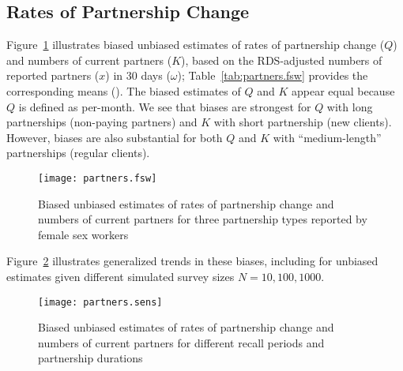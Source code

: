 \subsection{Rates of Partnership Change}\label{res.partners}
Figure~\ref{fig:partners.fsw} illustrates biased \vs unbiased estimates of
rates of partnership change ($Q$) and numbers of current partners ($K$),
based on the RDS-adjusted numbers of reported partners ($x$) in 30 days ($\omega$);
Table~\ref{tab:partners.fsw} provides the corresponding means (\ci).
The biased estimates of $Q$ and $K$ appear equal because $Q$ is defined as per-month.
We see that biases are strongest for
$Q$ with long partnerships (\eg non-paying partners) and
$K$ with short partnership (\eg new clients).
However, biases are also substantial for
both $Q$ and $K$ with ``medium-length'' partnerships (\eg regular clients).
\begin{figure}
  \centering\texttt{[image: partners.fsw]}
  \caption{Biased \vs unbiased estimates of
    rates of partnership change and numbers of current partners
    for three partnership types reported by female sex workers}
  \label{fig:partners.fsw}
\end{figure}
\par
Figure~\ref{fig:partners.sens} illustrates generalized trends in these biases,
including \ci for unbiased estimates given different simulated survey sizes $N = 10, 100, 1000$.
\begin{figure}
  \centering\texttt{[image: partners.sens]}
  \caption{Biased \vs unbiased estimates of
    rates of partnership change and numbers of current partners
    for different recall periods and partnership durations}
  \label{fig:partners.sens}
\end{figure}
